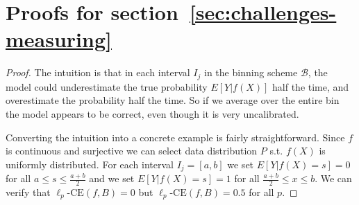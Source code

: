 \section{Proofs for section~\ref{sec:challenges-measuring}}


\continuousNotCalibrated*

\begin{proof}
The intuition is that in each interval $I_j$ in the binning scheme $\mathcal{B}$, the model could underestimate the true probability $E[Y | f(X)]$ half the time, and overestimate the probability half the time. So if we average over the entire bin the model appears to be correct, even though it is very uncalibrated.

Converting the intuition into a concrete example is fairly straightforward. Since $f$ is continuous and surjective we can select data distribution $P$ s.t. $f(X)$ is uniformly distributed.
For each interval $I_j = [a, b]$ we set $E[Y | f(X) = s] = 0$ for all $a \leq s \leq \frac{a+b}{2}$ and we set $E[Y | f(X) = s] = 1$ for all $\frac{a+b}{2} \leq x \leq b$.
We can verify that $\ell_p\mbox{-CE}(f, B) = 0$ but $\ell_p\mbox{-CE}(f, B) = 0.5$ for all $p$.
\end{proof}


\binningLowerBound*

